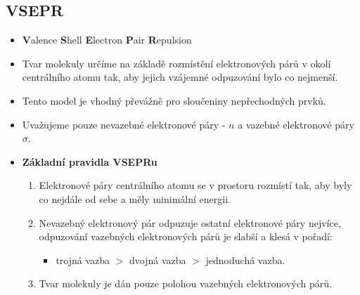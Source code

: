 \subsection{VSEPR}

\begin{itemize}
	\item \textbf{V}alence \textbf{S}hell \textbf{E}lectron \textbf{P}air \textbf{R}epulsion
	\item Tvar molekuly určíme na základě rozmístění elektronových párů v okolí centrálního atomu tak, aby jejich vzájemné odpuzování bylo co nejmenší.
	\item Tento model je vhodný převážně pro sloučeniny nepřechodných prvků.
	\item Uvažujeme pouze nevazebné elektronové páry - $n$ a vazebné elektronové páry $\sigma$.
	\item \textbf{Základní pravidla VSEPRu}
	\begin{enumerate}
		\item Elektronové páry centrálního atomu se v prostoru rozmístí tak, aby byly co nejdále od sebe a měly minimální energii.
		\item Nevazebný elektronový pár odpuzuje ostatní elektronové páry nejvíce, odpuzování  vazebných elektronových párů je slabší a klesá v pořadí:
		\begin{itemize}
			\item trojná vazba $>$ dvojná vazba $>$ jednoduchá vazba.
		\end{itemize}
		\item Tvar molekuly je dán pouze polohou vazebných elektronových párů.
	\end{enumerate}
\end{itemize}

